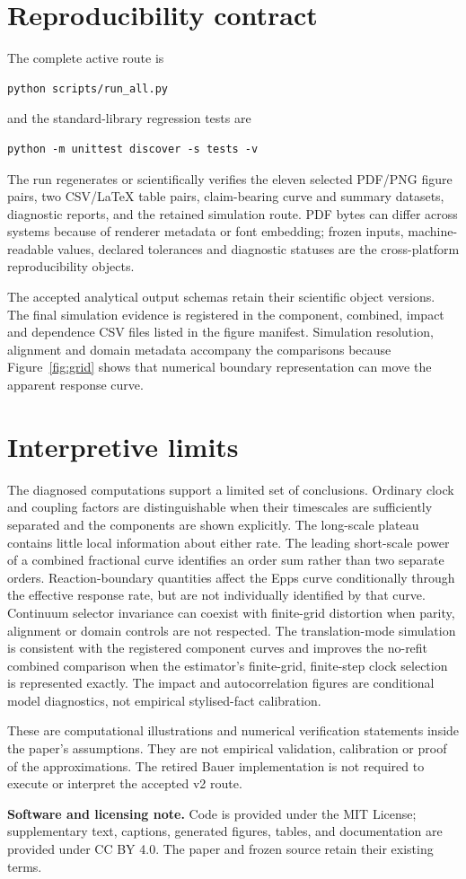 \documentclass[11pt]{article}
\begin{document}
\section{Reproducibility contract}

The complete active route is
\begin{verbatim}
python scripts/run_all.py
\end{verbatim}
and the standard-library regression tests are
\begin{verbatim}
python -m unittest discover -s tests -v
\end{verbatim}
The run regenerates or scientifically verifies the eleven selected PDF/PNG figure pairs, two CSV/LaTeX table pairs, claim-bearing curve and summary datasets, diagnostic reports, and the retained simulation route. PDF bytes can differ across systems because of renderer metadata or font embedding; frozen inputs, machine-readable values, declared tolerances and diagnostic statuses are the cross-platform reproducibility objects.

The accepted analytical output schemas retain their scientific object versions. The final simulation evidence is registered in the component, combined, impact and dependence CSV files listed in the figure manifest. Simulation resolution, alignment and domain metadata accompany the comparisons because Figure~\ref{fig:grid} shows that numerical boundary representation can move the apparent response curve.

\section{Interpretive limits}

The diagnosed computations support a limited set of conclusions. Ordinary clock and coupling factors are distinguishable when their timescales are sufficiently separated and the components are shown explicitly. The long-scale plateau contains little local information about either rate. The leading short-scale power of a combined fractional curve identifies an order sum rather than two separate orders. Reaction-boundary quantities affect the Epps curve conditionally through the effective response rate, but are not individually identified by that curve. Continuum selector invariance can coexist with finite-grid distortion when parity, alignment or domain controls are not respected. The translation-mode simulation is consistent with the registered component curves and improves the no-refit combined comparison when the estimator's finite-grid, finite-step clock selection is represented exactly. The impact and autocorrelation figures are conditional model diagnostics, not empirical stylised-fact calibration.

These are computational illustrations and numerical verification statements inside the paper's assumptions. They are not empirical validation, calibration or proof of the approximations. The retired Bauer implementation is not required to execute or interpret the accepted v2 route.

\medskip
\noindent\textbf{Software and licensing note.} Code is provided under the MIT License; supplementary text, captions, generated figures, tables, and documentation are provided under CC BY 4.0. The paper and frozen source retain their existing terms.
\end{document}
